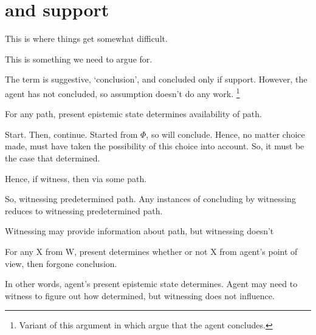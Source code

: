 \section{ and support}
\label{cha:fcs:sec:fc3-support}

\begin{note}
  This is where things get somewhat difficult.

  This is something we need to argue for.

  The term is suggestive, `conclusion', and concluded only if support.
  However, the agent has not concluded, so assumption doesn't do any work.%
  \footnote{
    Variant of this argument in which argue that the agent concludes.
  }
\end{note}

\begin{note}
  \begin{proposition}
    For any path, present epistemic state determines availability of path.
  \end{proposition}

  Start.
  Then, continue.
  Started from \(\Phi\), so will conclude.
  Hence, no matter choice made, must have taken the possibility of this choice into account.
  So, it must be the case that determined.

  Hence, if witness, then via some path.

  So, witnessing predetermined path.
  Any instances of concluding by witnessing reduces to witnessing predetermined path.

  Witnessing may provide information about path, but witnessing doesn't 


  For any X from W,
  present determines whether or not X from agent's point of view, then forgone conclusion.

  In other words, agent's present epistemic state determines.
  Agent may need to witness to figure out how determined, but witnessing does not influence.
\end{note}

